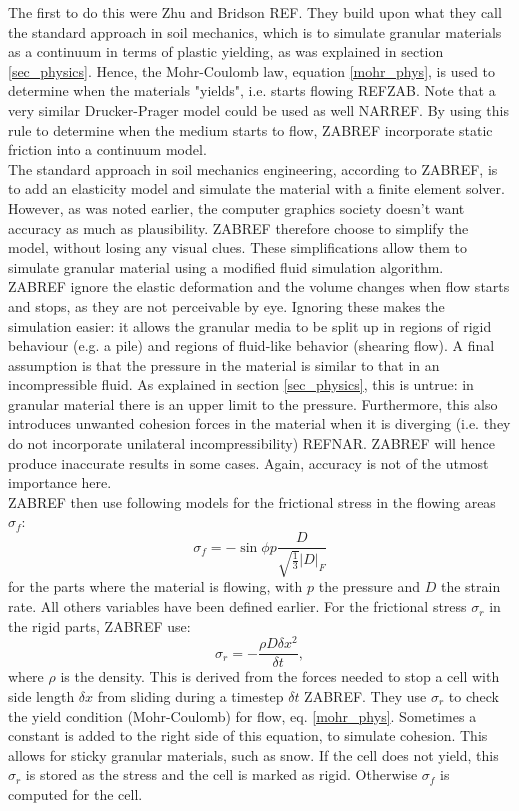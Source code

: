 The first to do this were Zhu and Bridson REF. They build upon what they call the standard approach in soil mechanics, which is to simulate granular materials as a continuum in terms of plastic yielding, as was explained in section \ref{sec_physics}. Hence, the Mohr-Coulomb law, equation \eqref{mohr_phys}, is used to determine when the materials "yields", i.e. starts flowing REFZAB. Note that a very similar Drucker-Prager model could be used as well NARREF. By using this rule to determine when the medium starts to flow, ZABREF incorporate static friction into a continuum model.\\

The standard approach in soil mechanics engineering, according to ZABREF, is to add an elasticity model and simulate the material with a finite element solver. However, as was noted earlier, the computer graphics society doesn't want accuracy as much as plausibility. ZABREF therefore choose to simplify the model, without losing any visual clues. These simplifications allow them to simulate granular material using a modified fluid simulation algorithm.\\

ZABREF ignore the elastic deformation and the volume changes when flow starts and stops, as they are not perceivable by eye. Ignoring these makes the simulation easier: it allows the granular media to be split up in regions of rigid behaviour (e.g. a pile) and regions of fluid-like behavior (shearing flow). A final assumption is that the pressure in the material is similar to that in an incompressible fluid. As explained in section \ref{sec_physics}, this is untrue: in granular material there is an upper limit to the pressure. Furthermore, this also introduces unwanted cohesion forces in the material when it is diverging (i.e. they do not incorporate unilateral incompressibility) REFNAR. ZABREF will hence produce inaccurate results in some cases. Again, accuracy is not of the utmost importance here.\\

ZABREF then use following models for the frictional stress in the flowing areas $\sigma_f$:
\begin{equation}
\sigma_f = - \sin \phi p \frac{D}{\sqrt{\frac{1}{3}} |D|_F}
\end{equation}
for the parts where the material is flowing, with $p$ the pressure and $D$ the strain rate. All others variables have been defined earlier. For the frictional stress $\sigma_r$ in the rigid parts, ZABREF use:
\begin{equation}
\sigma_r = - \frac{\rho D \delta x^2}{\delta t},
\end{equation}
where $\rho$ is the density. This is derived from the forces needed to stop a cell with side length $ \delta x$ from sliding during a timestep $\delta t$ ZABREF. They use $\sigma_r$ to check the yield condition (Mohr-Coulomb) for flow, eq. \eqref{mohr_phys}. Sometimes a constant is added to the right side of this equation, to simulate cohesion. This allows for sticky granular materials, such as snow. If the cell does not yield, this $\sigma_r$ is stored as the stress and the cell is marked as rigid. Otherwise $\sigma_f$ is computed for the cell.\\

